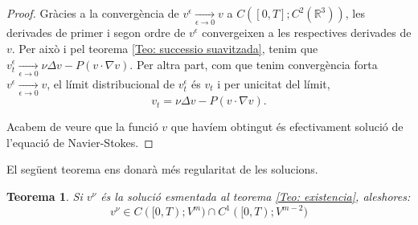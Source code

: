 \documentclass{article}
\numberwithin{equation}{section}
\newtheorem{teorema}{Teorema}[section]
\begin{document}
\begin{proof}
Gr\`{a}cies a la converg\`{e}ncia de $v^{\epsilon}\xrightarrow[\epsilon\to0]{}v$ a $C([0,T];C^2(\mathbb{R}^3))$, les derivades de primer i segon ordre de $v^{\epsilon}$ convergeixen a les respectives derivades de $v$. Per aix\`{o} i pel teorema \ref{Teo: successio suavitzada}, tenim que $v_t^{\epsilon}\xrightarrow[\epsilon\to0]{}\nu\Delta v-P(v\cdot\nabla v)$. Per altra part, com que tenim converg\`{e}ncia forta $v^{\epsilon}\xrightarrow[\epsilon\to0]{}v$, el l\'{i}mit distribucional de $v_t^{\epsilon}$ \'{e}s $v_t$ i per unicitat del l\'{i}mit,
\[v_t=\nu\Delta v-P(v\cdot\nabla v).\]

Acabem de veure que la funci\'{o} $v$ que hav\'{i}em obtingut \'{e}s efectivament soluci\'{o} de l'equaci\'{o} de Navier-Stokes.
\end{proof}

El seg\"{u}ent teorema ens donar\`{a} m\'{e}s regularitat de les solucions.

\begin{teorema}
Si $v^{\nu}$ \'{e}s la soluci\'{o} esmentada al teorema \ref{Teo: existencia}, aleshores:
\[v^{\nu}\in C([0,T);V^m)\cap C^1([0,T);V^{m-2})\]
\end{teorema}
\end{document}
